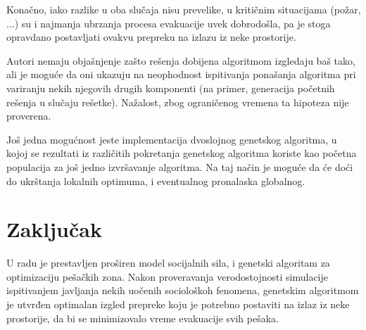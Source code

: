 \documentclass[12pt]{article}
\begin{document}
Konačno, iako razlike u oba slučaja nisu prevelike, u kritičnim situacijama (požar, ...) su i najmanja ubrzanja procesa evakuacije uvek dobrodošla, pa je stoga opravdano postavljati ovakvu prepreku na izlazu iz neke prostorije.

Autori nemaju objašnjenje zašto rešenja dobijena algoritmom izgledaju baš tako, ali je moguće da oni ukazuju na neophodnost ispitivanja ponašanja algoritma pri variranju nekih njegovih drugih komponenti (na primer, generacija početnih rešenja u slučaju rešetke). Nažalost, zbog ograničenog vremena ta hipoteza nije proverena.

Još jedna mogućnost jeste implementacija dvoslojnog genetskog algoritma, u kojoj se rezultati iz različitih pokretanja genetskog algoritma koriste kao početna populacija za još jedno izvršavanje algoritma. Na taj način je moguće da će doći do ukrštanja lokalnih optimuma, i eventualnog pronalaska globalnog.

\section{Zaključak}

U radu je prestavljen proširen model socijalnih sila, i genetski algoritam za optimizaciju pešačkih zona. Nakon proveravanja verodostojnosti simulacije ispitivanjem javljanja nekih uočenih sociološkoh fenomena, genetskim algoritmom je utvrđen optimalan izgled prepreke koju je potrebno postaviti na izlaz iz neke prostorije, da bi se minimizovalo vreme evakuacije svih pešaka.

  
\begin{scriptsize}

\end{scriptsize}
\end{document}
